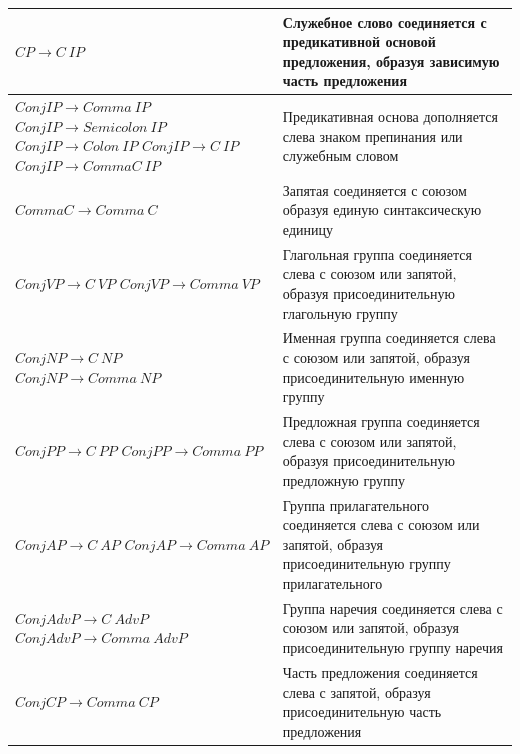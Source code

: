 \begin{longtable}{|L{.35\textwidth}|L{.55\textwidth}|}
	$CP \rightarrow C\ IP$ &
	Служебное слово соединяется с предикативной основой предложения, образуя зависимую часть предложения\\\hline
	
	$ConjIP \rightarrow Comma\ IP$\newline
	$ConjIP \rightarrow Semicolon\ IP$\newline
	$ConjIP \rightarrow Colon\ IP$\newline
	$ConjIP \rightarrow C\ IP$\newline
	$ConjIP \rightarrow CommaC\ IP$ &
	Предикативная основа дополняется слева знаком препинания или служебным словом\\\hline
	
	$CommaC \rightarrow Comma\ C$ &
	Запятая соединяется с союзом образуя единую синтаксическую единицу\\\hline
	
	$ConjVP \rightarrow C\ VP$\newline
	$ConjVP \rightarrow Comma\ VP$ &
	Глагольная группа соединяется слева с союзом или запятой, образуя присоединительную глагольную группу\\\hline
	
	$ConjNP \rightarrow C\ NP$\newline
	$ConjNP \rightarrow Comma\ NP$ &
	Именная группа соединяется слева с союзом или запятой, образуя присоединительную именную группу\\\hline
	
	$ConjPP \rightarrow C\ PP$\newline
	$ConjPP \rightarrow Comma\ PP$ &
	Предложная группа соединяется слева с союзом или запятой, образуя присоединительную предложную группу\\\hline
	
	$ConjAP \rightarrow C\ AP$\newline
	$ConjAP \rightarrow Comma\ AP$ &
	Группа прилагательного соединяется слева с союзом или запятой, образуя присоединительную группу прилагательного\\\hline
	
	$ConjAdvP \rightarrow C\ AdvP$\newline
	$ConjAdvP \rightarrow Comma\ AdvP$ &
	Группа наречия соединяется слева с союзом или запятой, образуя присоединительную группу наречия\\\hline
	
	$ConjCP \rightarrow Comma\ CP$ &
	Часть предложения соединяется слева с запятой, образуя присоединительную часть предложения\\
\end{longtable}
\egroup
\normalsize

